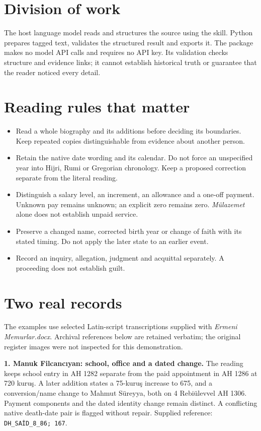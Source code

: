 \documentclass[11pt,a4paper]{article}
\begin{document}
\section{Division of work}
The host language model reads and structures the source using the skill. Python prepares tagged text, validates the structured result and exports it. The package makes no model API calls and requires no API key. Its validation checks structure and evidence links; it cannot establish historical truth or guarantee that the reader noticed every detail.

\newpage
\section{Reading rules that matter}
\begin{itemize}
\item Read a whole biography and its additions before deciding its boundaries. Keep repeated copies distinguishable from evidence about another person.
\item Retain the native date wording and its calendar. Do not force an unspecified year into Hijri, Rumi or Gregorian chronology. Keep a proposed correction separate from the literal reading.
\item Distinguish a salary level, an increment, an allowance and a one-off payment. Unknown pay remains unknown; an explicit zero remains zero. \emph{Mülazemet} alone does not establish unpaid service.
\item Preserve a changed name, corrected birth year or change of faith with its stated timing. Do not apply the later state to an earlier event.
\item Record an inquiry, allegation, judgment and acquittal separately. A proceeding does not establish guilt.
\end{itemize}

\section{Two real records}
The examples use selected Latin-script transcriptions supplied with \emph{Ermeni Memurlar.docx}. Archival references below are retained verbatim; the original register images were not inspected for this demonstration.

\textbf{1. Manuk Filcancıyan: school, office and a dated change.}
The reading keeps school entry in AH 1282 separate from the paid appointment in AH 1286 at 720 kuruş. A later addition states a 75-kuruş increase to 675, and a conversion/name change to Mahmut Süreyya, both on 4 Rebiülevvel AH 1306. Payment components and the dated identity change remain distinct. A conflicting native death-date pair is flagged without repair. Supplied reference: \texttt{DH\_SAİD\_8\_86; 167}.
\end{document}
